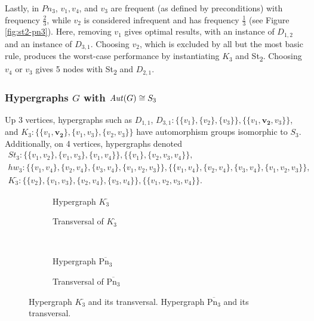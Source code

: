 Lastly, in $Pn_3$, $v_1,v_4$, and $v_3$ are frequent (as defined by \FKA{} preconditions) with frequency $\frac{2}{3}$, while $v_2$ is considered infrequent and has frequency $\frac{1}{3}$ (see Figure \ref{fig:st2-pn3}). Here, removing $v_1$ gives optimal results, with an instance of $D_{1,2}$ and an instance of $D_{3,1}$. Choosing $v_2$, which is excluded by all but the most basic rule, produces the worst-case performance by instantiating $K_3$ and St\textsubscript{2}. Choosing $v_4$ or $v_3$ gives 5 nodes with St\textsubscript{2} and $D_{2,1}$.

\subsubsection*{Hypergraphs $G$ with $\mathit{Aut}(G)\cong S_3$}

Up 3 vertices, hypergraphs such as $D_{1,1}$, $D_{3,1}:\{\{v_1\},\{v_2\},\{v_3\}\},\{\{v_1,\mathbf{v_2},v_3\}\}$, and $K_3:\{\{v_1,\mathbf{v_2}\},\{v_1,v_3\},\{v_2,v_3\}\}$ have automorphism groups isomorphic to $S_3$. Additionally, on 4 vertices, hypergraphs denoted
\begin{gather*}
St_3:\{\{v_1,v_2\},\{v_1,v_3\},\{v_1,v_4\}\},\{\{v_1\},\{v_2,v_3,v_4\}\},\\[4pt]
hw_3:\{\{v_1,v_4\},\{v_2,v_4\},\{v_3,v_4\},\{v_1,v_2,v_3\}\},\{\{v_1,v_4\},\{v_2,v_4\},\{v_3,v_4\},\{v_1,v_2,v_3\}\},\\[4pt]
K_3^{\cdot}:\{\{v_2\},\{v_1,v_3\},\{v_2,v_4\},\{v_3,v_4\}\},\{\{v_1,v_2,v_3,v_4\}\}.
\end{gather*}

\begin{figure}[tp]
\centering
\begin{subfigure}{0.45\linewidth}\centering\caption{Hypergraph $K_3^{\cdot}$}\end{subfigure}\hfill
\begin{subfigure}{0.45\linewidth}\centering\caption{Transversal of $K_3^{\cdot}$}\end{subfigure}\\[8pt]
\begin{subfigure}{0.45\linewidth}\centering\caption{Hypergraph $\overline{\text{Pn}_3}$}\end{subfigure}\hfill
\begin{subfigure}{0.45\linewidth}\centering\caption{Transversal of $\overline{\text{Pn}_3}$}\end{subfigure}
\caption{Hypergraph $K_3^{\cdot}$ and its transversal. Hypergraph $\overline{\text{Pn}_3}$ and its transversal.}\label{fig:k3dot-pn3bar}
\end{figure}

